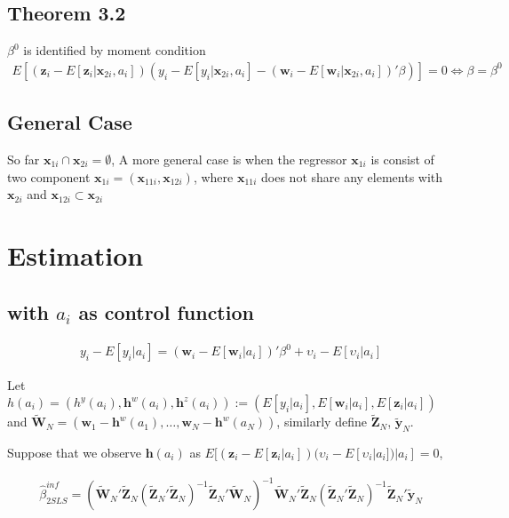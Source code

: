 \documentclass[11pt]{article}
\begin{document}
\subsection{Theorem 3.2} 
$\beta^0$ is identified by moment condition 
\begin{align}
E[(\mathbf{z}_i - E[\mathbf{z}_i|\mathbf{x}_{2i},a_i]) (y_i - E[y_i | \mathbf{x}_{2i},a_i ] - (\mathbf{w}_i - E[\mathbf{w}_i | \mathbf{x}_{2i},a_i])'\beta)] = 0 \Leftrightarrow \beta = \beta^0
\end{align}
\subsection{General Case} 
So far $\mathbf{x}_{1i} \cap \mathbf{x}_{2i} = \emptyset$, A more general case is when the regressor $\mathbf{x}_{1i}$ is consist of two component $\mathbf{x}_{1i} = (\mathbf{x}_{11i},\mathbf{x}_{12i})$, where $\mathbf{x}_{11i}$ does not share any elements with $\mathbf{x}_{2i}$ and $\mathbf{x}_{12i} \subset \mathbf{x}_{2i}$

\section{Estimation}
\subsection{with $a_i$ as control function}
\begin{align}
y_i - E[y_i|a_i] = (\mathbf{w}_i - E[\mathbf{w}_i|a_i])'\beta^0 + \upsilon_i - E[\upsilon_i | a_i]
\end{align}

Let $h(a_i) = (h^y(a_i),\mathbf{h}^w(a_i),\mathbf{h}^z(a_i)) := (E[y_i|a_i],E[\mathbf{w}_i|a_i],E[\mathbf{z}_i|a_i])$ and $\tilde{\mathbf{W}}_N = (\mathbf{w}_1 - \mathbf{h}^w(a_1),\dots,\mathbf{w}_N - \mathbf{h}^w(a_N))$, similarly define $\tilde{\mathbf{Z}}_N$, $\tilde{\mathbf{y}}_N$.

Suppose that we observe $\mathbf{h}(a_i)$ as $E[(\mathbf{z}_i - E[\mathbf{z}_i|a_i]) (\upsilon_i - E[\upsilon_i | a_i])  | a_i]=0$,

  \begin{align}
\hat{\beta}_{2SLS}^{inf} = (\tilde{\mathbf{W}}_{N}'\tilde{\mathbf{Z}}_{N}(\tilde{\mathbf{Z}}_{N}'\tilde{\mathbf{Z}}_{N})^{-1}\tilde{\mathbf{Z}}_{N}'\tilde{\mathbf{W}}_{N})^{-1}\tilde{\mathbf{W}}_{N}'\tilde{\mathbf{Z}}_{N}(\tilde{\mathbf{Z}}_{N}'\tilde{\mathbf{Z}}_{N})^{-1}\tilde{\mathbf{Z}}_{N}'\tilde{\mathbf{y}}_{N}
  \end{align}
\end{document}

